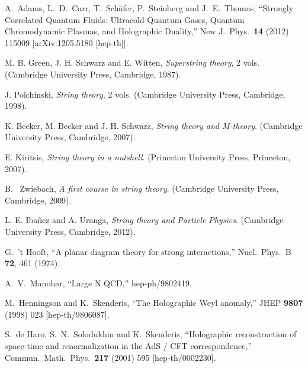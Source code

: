\documentclass[12pt,notitlepage,a4paper]{article}
\begin{document}
\begin{thebibliography}{99.}
 
  A.~Adams, L.~D.~Carr, T.~Sch\"afer, P.~Steinberg and J.~E.~Thomas,
  ``Strongly Correlated Quantum Fluids: Ultracold Quantum Gases, Quantum Chromodynamic Plasmas, and Holographic Duality,''
  New J.\ Phys.\  {\bf 14} (2012) 115009
  [arXiv:1205.5180 [hep-th]].
 
 
 M. B. Green, J. H. Schwarz and E. Witten, {\it Superstring theory}, 2 vols. 
 (Cambridge University Press, Cambridge, 1987). 
 
   J. Polchinski,  {\it String theory}, 2 vols. 
 (Cambridge University Press, Cambridge, 1998). 

 
 K. Becker, M. Becker and J. H. Schwarz, 
 {\it String theory and M-theory}.  (Cambridge University Press, Cambridge, 2007). 
 
E. Kiritsis,  {\it String theory in a nutshell}.  (Princeton University Press, Princeton, 2007). 
 

 B. ~Zwiebach, {\it A first course in string theory}. (Cambridge University Press, Cambridge, 2009). 
 
 
L. E. Iba\~nez and A. Uranga,  {\it String theory and Particle Physics}.
(Cambridge University Press, Cambridge, 2012). 

 

  G.~'t Hooft,
  ``A planar diagram theory for strong interactions,''
  Nucl.\ Phys.\  B {\bf 72}, 461 (1974).





  A.~V.~Manohar,
  ``Large N QCD,''
  hep-ph/9802419.



  M.~Henningson and K.~Skenderis,
  ``The Holographic Weyl anomaly,''
  JHEP {\bf 9807} (1998) 023
  [hep-th/9806087].
 
 
 
 
  S.~de Haro, S.~N.~Solodukhin and K.~Skenderis,
  ``Holographic reconstruction of space-time and renormalization in the AdS / CFT correspondence,''
  Commun.\ Math.\ Phys.\  {\bf 217} (2001) 595
  [hep-th/0002230].
  

\end{thebibliography}
\end{document}
